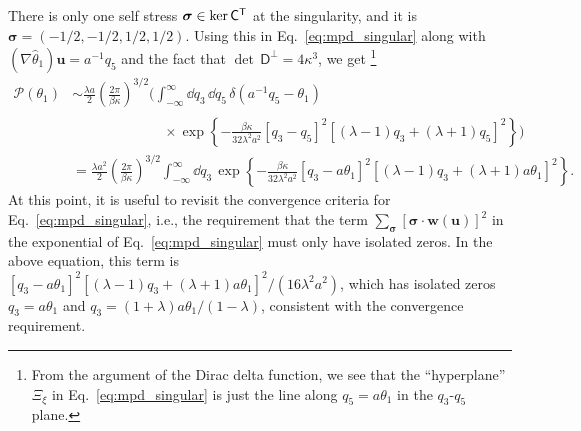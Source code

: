 %
There is only one self stress $\bm{\sigma}\in \ker\mathsf{C}^\mathsf{T}$ at the singularity, and it is $\bm{\sigma} = \left(-1/2, -1/2, 1/2, 1/2\right)$.
Using this in Eq.~\eqref{eq:mpd_singular} along with $(\nabla\hat{\theta}_{1})\bm{u} = a^{-1}q_{5}$ and the fact that $\det\,\mathsf{D}^\perp = 4\kappa^3$, we get%
\footnote{From the argument of the Dirac delta function, we see that the ``hyperplane'' $\Xi_{\xi}$ in Eq.~\eqref{eq:mpd_singular} is just the line along $q_{5} = a\theta_{1}$ in the $q_{3}$-$q_{5}$ plane.}
%
\begin{equation}
  \begin{aligned}
    \mathscr{P}(\theta_1) %
                                           &\sim \frac{\lambda a}{2}\left(\frac{2\pi}{\beta\kappa}\right)^{3/2}\Biggl(\int_{-\infty}^{\infty} \dd{q}_3\, \dd{q}_{5}\, \delta(a^{-1}q_{5} - \theta_{1})\\
                                           &\phantom{\sim \frac{\lambda a}{2}\left(\frac{2\pi}{\beta\kappa}\right)^{3/2}}\quad\times\exp\left\{-\frac{\beta\kappa}{32\lambda^2a^2}\left[q_3 - q_5\right]^2\left[(\lambda-1)q_3 + (\lambda+1)q_5\right]^2\right\}\Biggr)\\
                                           &= \frac{\lambda a^2}{2}\left(\frac{2\pi}{\beta\kappa}\right)^{3/2}\int_{-\infty}^{\infty} \dd{q}_3\, \exp\left\{-\frac{\beta\kappa}{32\lambda^2a^2}\left[q_3 - a\theta_{1}\right]^2\left[(\lambda-1)q_3 + (\lambda+1)a\theta_{1}\right]^2\right\}.
  \end{aligned}
  \label{eq:4bar_mpd_int}
\end{equation}
%
At this point, it is useful to revisit the convergence criteria for Eq.~\eqref{eq:mpd_singular}, i.e., the requirement that the term $\sum_{\bm{\sigma}} [\bm{\sigma}\cdot \bm{w}(\bm{u})]^{2}$ in the exponential of Eq.~\eqref{eq:mpd_singular} must only have isolated zeros. In the above equation, this term is $[q_3 - a\theta_{1}]^{2}[(\lambda-1)q_3 + (\lambda+1)a\theta_{1}]^{2}/(16\lambda^{2}a^{2})$, which has isolated zeros $q_{3} = a\theta_{1}$ and $q_{3} = (1+\lambda)a\theta_{1}/(1-\lambda)$, consistent with the convergence requirement.

